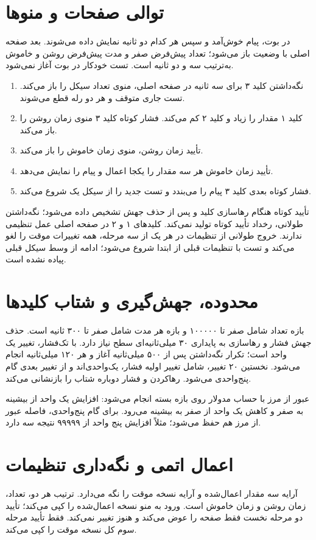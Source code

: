 \section{توالی صفحات و منوها}
در بوت، پیام خوش‌آمد و سپس  هر کدام دو ثانیه نمایش داده می‌شوند. بعد صفحه اصلی با وضعیت  باز می‌شود؛ تعداد پیش‌فرض صفر و مدت پیش‌فرض روشن و خاموش به‌ترتیب سه و دو ثانیه است. تست خودکار در بوت آغاز نمی‌شود.

\begin{enumerate}
\item نگه‌داشتن کلید ۳ برای سه ثانیه در صفحه اصلی، منوی تعداد سیکل را باز می‌کند. تست جاری متوقف و هر دو رله قطع می‌شوند.
\item کلید ۱ مقدار را زیاد و کلید ۲ کم می‌کند. فشار کوتاه کلید ۳ منوی زمان روشن را باز می‌کند.
\item تأیید زمان روشن، منوی زمان خاموش را باز می‌کند.
\item تأیید زمان خاموش هر سه مقدار را یکجا اعمال و پیام  را نمایش می‌دهد.
\item فشار کوتاه بعدی کلید ۳ پیام را می‌بندد و تست جدید را از سیکل یک شروع می‌کند.
\end{enumerate}

تأیید کوتاه هنگام رهاسازی کلید و پس از حذف جهش تشخیص داده می‌شود؛ نگه‌داشتن طولانی، رخداد تأیید کوتاه تولید نمی‌کند. کلیدهای ۱ و ۲ در صفحه اصلی عمل تنظیمی ندارند. خروج طولانی از تنظیمات در هر یک از سه مرحله، همه تغییرات موقت را لغو می‌کند و تست با تنظیمات قبلی از ابتدا شروع می‌شود؛ ادامه از وسط سیکل قبلی پیاده نشده است.

\section{محدوده، جهش‌گیری و شتاب کلیدها}
بازه تعداد شامل صفر تا ۱۰۰۰۰۰ و بازه هر مدت شامل صفر تا ۳۰۰ ثانیه است. حذف جهش فشار و رهاسازی به پایداری ۳۰ میلی‌ثانیه‌ای سطح نیاز دارد. با تک‌فشار، تغییر یک واحد است؛ تکرار نگه‌داشتن پس از ۵۰۰ میلی‌ثانیه آغاز و هر ۱۲۰ میلی‌ثانیه انجام می‌شود. نخستین ۲۰ تغییر، شامل تغییر اولیه فشار، یک‌واحدی‌اند و از تغییر بعدی گام پنج‌واحدی می‌شود. رهاکردن و فشار دوباره شتاب را بازنشانی می‌کند.

عبور از مرز با حساب مدولار روی بازه بسته انجام می‌شود: افزایش یک واحد از بیشینه به صفر و کاهش یک واحد از صفر به بیشینه می‌رود. برای گام پنج‌واحدی، فاصله عبور از مرز هم حفظ می‌شود؛ مثلاً افزایش پنج واحد از ۹۹۹۹۹ نتیجه سه دارد.

\section{اعمال اتمی و نگه‌داری تنظیمات}
آرایه  سه مقدار اعمال‌شده و آرایه  نسخه موقت را نگه می‌دارد. ترتیب هر دو، تعداد، زمان روشن و زمان خاموش است. ورود به منو نسخه اعمال‌شده را کپی می‌کند؛ تأیید دو مرحله نخست فقط صفحه را عوض می‌کند و هنوز  تغییر نمی‌کند. فقط تأیید مرحله سوم کل نسخه موقت را کپی می‌کند.

